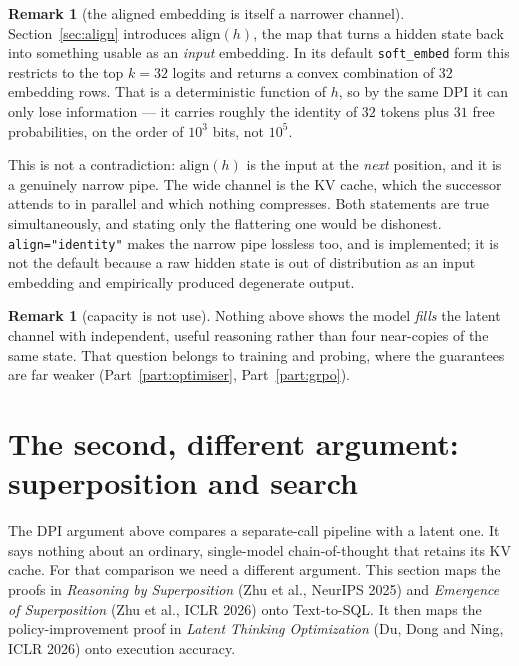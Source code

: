 \documentclass[11pt]{article}
\theoremstyle{definition}
\newtheorem{remark}[theorem]{Remark}
\begin{document}
\begin{remark}[the aligned embedding is itself a narrower channel]
Section~\ref{sec:align} introduces $\mathrm{align}(h)$, the map that turns a hidden state back into something usable as an \emph{input} embedding. In its default \texttt{soft\_embed} form this restricts to the top $k=32$ logits and returns a convex combination of $32$ embedding rows. That is a deterministic function of $h$, so by the same DPI it can only lose information --- it carries roughly the identity of $32$ tokens plus $31$ free probabilities, on the order of $10^{3}$ bits, not $10^{5}$.

This is not a contradiction: $\mathrm{align}(h)$ is the input at the \emph{next} position, and it is a genuinely narrow pipe. The wide channel is the KV cache, which the successor attends to in parallel and which nothing compresses. Both statements are true simultaneously, and stating only the flattering one would be dishonest. \texttt{align="identity"} makes the narrow pipe lossless too, and is implemented; it is not the default because a raw hidden state is out of distribution as an input embedding and empirically produced degenerate output.
\end{remark}

\begin{remark}[capacity is not use]
Nothing above shows the model \emph{fills} the latent channel with independent, useful reasoning rather than four near-copies of the same state. That question belongs to training and probing, where the guarantees are far weaker (Part~\ref{part:optimiser}, Part~\ref{part:grpo}).
\end{remark}

\section{The second, different argument: superposition and search}
\label{sec:superposition}

The DPI argument above compares a separate-call pipeline with a latent one. It says nothing about an ordinary, single-model chain-of-thought that retains its KV cache. For that comparison we need a different argument. This section maps the proofs in \emph{Reasoning by Superposition} (Zhu et al., NeurIPS 2025) and \emph{Emergence of Superposition} (Zhu et al., ICLR 2026) onto Text-to-SQL. It then maps the policy-improvement proof in \emph{Latent Thinking Optimization} (Du, Dong and Ning, ICLR 2026) onto execution accuracy.
\end{document}
